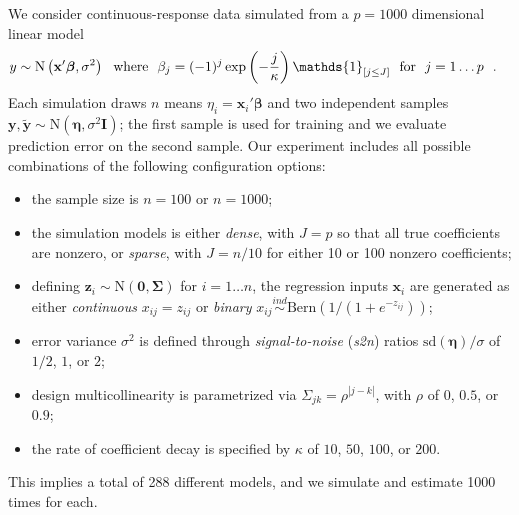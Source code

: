 \documentclass[12pt]{article}
\newcommand{\bs}[1]{\boldsymbol{#1}}
\newcommand{\mr}[1]{\mathrm{#1}}
\newcommand{\bm}[1]{\mathbf{#1}}
\newcommand{\ds}[1]{\mathds{#1}}
\begin{document}
We consider continuous-response data simulated from
 a $p=1000$ dimensional linear model
\begin{align}\vspace{-.1cm}
\label{simdgp}
y &\sim \mr{N}\left(\bm{x}'\bs{\beta},\sigma^2\right) ~~\text{where}~~
\beta_j = (-1)^j\exp\left(-\frac{j}{{\kappa}} \right)\ds{1}_{[j\leq J]}~~\text{for}~~j=1\dots p~~.
\end{align}\vspace{-.1cm}
Each simulation draws $n$ means $\eta_i =
\bm{x}_i'\bs{\beta}$ and two independent samples 
$\bm{y},\bm{\tilde y} \sim \mr{N}(\bs{\eta},\sigma^2\bm{I})$;  the first
sample is used for training and we evaluate prediction error on the second
sample.  Our experiment includes all possible combinations of the following configuration options:
\begin{itemize}\vspace{-.1cm}\setlength\itemsep{0em}
\item the sample size is $n=100$ or $n=1000$;
\item the simulation models is either {\it dense}, with $J=p$ so that all true coefficients are nonzero, or 
  {\it sparse}, with $J = n/10$ for either 10 or 100 nonzero coefficients;
\item defining $\bm{z}_i \sim \mr{N}\left(\bm{0},\bs{\Sigma}\right)$ for $i=1\ldots n$, the regression inputs $\bm{x}_i$ are generated as either \textit{continuous} $x_{ij}=z_{ij}$  or \textit{binary}  $x_{ij} \stackrel{ind}{\sim} \mr{Bern}\left( 1/(1+e^{-z_{ij}})\right)$;
\item error variance $\sigma^2$ is defined through {\it signal-to-noise} (\textit{s2n})
ratios $\mr{sd}(\bs{\eta})/\sigma$ of $1/2$, $1$, or $2$;
\item design multicollinearity is parametrized via $\Sigma_{jk} =
\rho^{|j-k|}$, with $\rho$ of $0$, $0.5$, or $0.9$;
\item the rate of coefficient decay is specified by
${\kappa}$ of $10$, $50$, $100$, or $200$.  
\end{itemize}\vspace{-.1cm}
This implies a total of 288 different models, and we simulate and estimate 1000 times for each.
\end{document}
